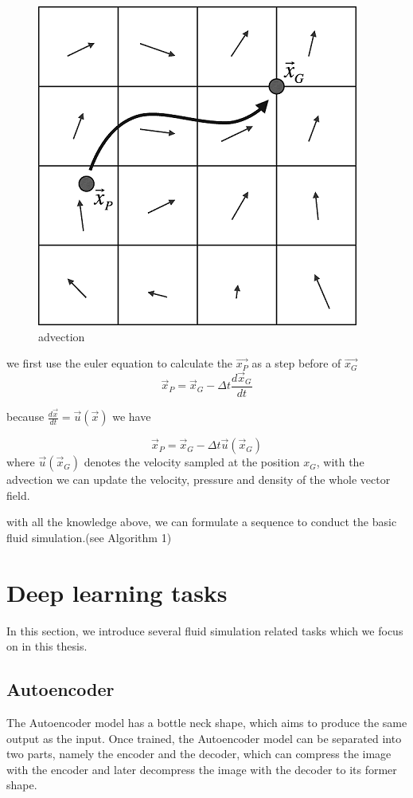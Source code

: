 \documentclass[a4paper,12pt,twoside]{report}
\begin{document}
\begin{figure}[h]
\centering
\includegraphics[scale=0.5]{advection.png}
\caption{advection\cite{semi}}
\end{figure}

we first use the euler equation to calculate the $\vec{x_P}$ as a step before of $\vec{x_G}$
\begin{equation}
\vec x_P=\vec x_G-\Delta t\frac{d\vec x_G}{dt}
\end{equation}

because $\frac{d\vec x}{dt}=\vec u(\vec x)$ we have

\begin{equation}
\vec x_P=\vec x_G-\Delta t\vec u(\vec x_G)
\end{equation}
where $\vec u(\vec x_G)$ denotes the velocity sampled at the position $x_G$, with the advection we can update the velocity, pressure and density of the whole vector field.

with all the knowledge above, we can formulate a sequence to conduct the basic fluid simulation.(see Algorithm 1)


\section{Deep learning tasks}
In this section, we introduce several fluid simulation related tasks which we focus on in this thesis.
\subsection{Autoencoder}
The Autoencoder model has a bottle neck shape, which aims to produce the same output as the input. Once trained, the Autoencoder model can be separated into two parts, namely the encoder and the decoder, which can compress the image with the encoder and later decompress the image with the decoder to its former shape.
\end{document}
